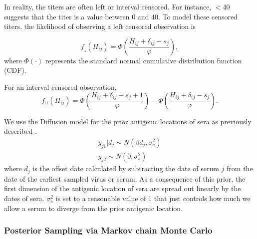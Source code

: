 \documentclass[11pt,oneside,letterpaper]{article}
\newcommand{\se}{s}									%
\newcommand{\threshold}{f_{\textstyle \lrcorner}}	%
\newcommand{\interval}{f_{\sqcup}}					%
\newcommand{\mdssd}{\varphi}						%
\begin{document}
 In reality, the titers are often left or interval censored. For instance, $<40$ suggests that the titer is a value between 0 and 40. To model these censored titers, the likelihood of observing a left censored observation is 

\begin{equation} 
	\threshold(H_{ij}) = \Phi \left( \frac{ H_{ij} + \delta_{ij} - \se_j }{ \mdssd } \right),
\end{equation}
where $\Phi(\cdot)$ represents the standard normal cumulative distribution function (CDF).

For an interval censored observation,
\begin{equation} 
	\interval(H_{ij}) = \Phi \left( \frac{ H_{ij} + \delta_{ij} - \se_j + 1 }{ \mdssd } \right) - \Phi \left( \frac{ H_{ij} + \delta_{ij} - \se_j }{\mdssd} \right).
\end{equation}



We use the Diffusion model for the prior antigenic locations of sera as previously described \cite{bedford_integrating_2014}. 
\begin{eqnarray}
	y_{j1} | d_j \sim N ( \beta d_j, \sigma^2_s )  \\
	y_{j2}  \sim N(0, \sigma^2_s)
\end{eqnarray}
where $d_j$ is the offset date calculated by subtracting the date of serum $j$ from the date of the earliest sampled virus or serum. 
As a consequence of this prior, the first dimension of the antigenic location of sera are spread out linearly by the dates of sera. 
$\sigma^2_s$ is set to a reasonable value of 1 that just controls how much we allow a serum to diverge from the prior antigenic location.








\subsubsection*{Posterior Sampling via Markov chain Monte Carlo}
\end{document}
